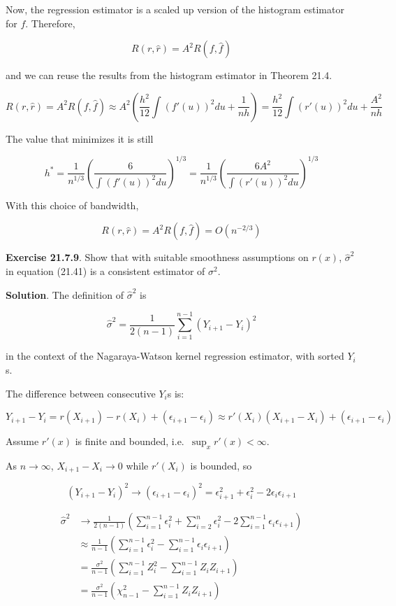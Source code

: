 Now, the regression estimator is a scaled up version of the histogram
estimator for \(f\). Therefore,

\[ R(r, \hat{r}) = A^{2} R(f, \hat{f}) \]

and we can reuse the results from the histogram estimator in Theorem
21.4.

\[ R(r, \hat{r}) = A^{2} R(f, \hat{f}) \approx A^{2} \left( \frac{h^{2}}{12} \int (f'(u))^{2} du + \frac{1}{nh} \right) = \frac{h^{2}}{12} \int (r'(u))^{2} du + \frac{A^{2}}{nh} \]

The value that minimizes it is still

\[ h^* = \frac{1}{n^{1/3}} \left( \frac{6}{\int (f'(u))^{2} du} \right)^{1/3} = \frac{1}{n^{1/3}} \left( \frac{6A^{2}}{\int (r'(u))^{2} du} \right)^{1/3}\]

With this choice of bandwidth,

\[ R(r, \hat{r}) = A^{2} R(f, \hat{f}) = O(n^{-2/3}) \]

\textbf{Exercise 21.7.9}. Show that with suitable smoothness assumptions
on \(r(x)\), \(\hat{\sigma}^{2}\) in equation (21.41) is a consistent
estimator of \(\sigma^{2}\).

\textbf{Solution}. The definition of \(\hat{\sigma}^{2}\) is

\[ \hat{\sigma}^{2} = \frac{1}{2(n - 1)} \sum_{i=1}^{n-1} (Y_{i+1} - Y_{i})^{2}\]

in the context of the Nagaraya-Watson kernel regression estimator, with
sorted \(Y_{i}\)s.

The difference between consecutive \(Y_{i}\)s is:

\[ Y_{i+1} - Y_{i} = r(X_{i+1}) - r(X_{i}) + (\epsilon_{i+1} - \epsilon_{i}) \approx r'(X_{i}) (X_{i+1} - X_{i}) + (\epsilon_{i+1} - \epsilon_{i}) \]

Assume \(r'(x)\) is finite and bounded, i.e.~\(\sup_x r'(x) < \infty\).

As \(n \rightarrow \infty\), \(X_{i+1} - X_{i} \rightarrow 0\) while
\(r'(X_{i})\) is bounded, so

\[ (Y_{i+1} - Y_{i})^{2} \rightarrow (\epsilon_{i+1} - \epsilon_{i})^{2} = \epsilon_{i+1}^{2} + \epsilon_{i}^{2} - 2\epsilon_{i} \epsilon_{i+1} \]

\begin{align*}
\hat{\sigma}^{2} &\rightarrow \frac{1}{2(n - 1)} \left(\sum_{i = 1}^{n - 1} \epsilon_{i}^{2} + \sum_{i = 2}^{n} \epsilon_{i}^{2} -2 \sum_{i = 1}^{n - 1} \epsilon_{i} \epsilon_{i+1} \right) \\
&\approx \frac{1}{n - 1} \left( \sum_{i = 1}^{n - 1} \epsilon_{i}^{2} - \sum_{i = 1}^{n - 1} \epsilon_{i} \epsilon_{i+1} \right) \\
&= \frac{\sigma^{2}}{n - 1} \left( \sum_{i = 1}^{n - 1} Z_{i}^{2} - \sum_{i = 1}^{n - 1} Z_{i} Z_{i+1} \right) \\
&= \frac{\sigma^{2}}{n - 1} \left( \chi_{n - 1}^{2} - \sum_{i = 1}^{n - 1} Z_{i} Z_{i+1} \right)
\end{align*}

